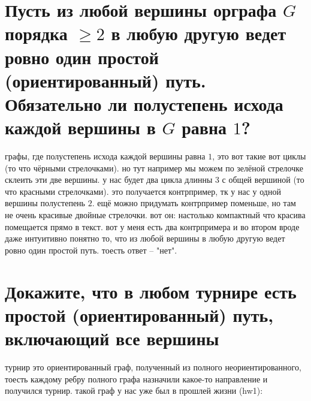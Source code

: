 \documentclass{article}
\begin{document}
  \section{Пусть из любой вершины орграфа $G$ порядка $\geq 2$ в любую другую ведет ровно один простой (ориентированный) путь. Обязательно ли полустепень исхода каждой вершины в $G$ равна $1$?}
  \begin{figure}
    \vspace{-1cm}
    \vspace{-1cm}
  \end{figure}
  графы, где полустепень исхода каждой вершины равна $1$, это вот такие вот циклы (то что чёрными стрелочками).
  но тут например мы можем по зелёной стрелочке склеить эти две вершины.
  у нас будет два цикла длинны $3$ с общей вершиной (то что красными стрелочками).
  это получается контрпример, тк у нас у одной вершины полустепень $2$.
  ещё можно придумать контрпример поменьше, но там не очень красивые двойные стрелочки.
  вот он:
  настолько компактный что красива помещается прямо в текст.
  вот у меня есть два контрпримера и во втором вроде даже интуитивно понятно то,
  что из любой вершины в любую другую ведет ровно один простой путь.
  тоесть ответ -- "{}нет"{}.

  \newpage
  \section{Докажите, что в любом турнире есть простой (ориентированный) путь, включающий все вершины}
  турнир это ориентированный граф, полученный из полного неориентированного,
  тоесть каждому ребру полного графа назначили какое-то направление и получился турнир.
  такой граф у нас уже был в прошлей жизни (hw1):
\end{document}
